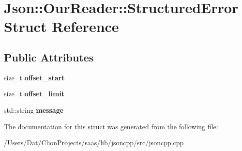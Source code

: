 \hypertarget{struct_json_1_1_our_reader_1_1_structured_error}{}\section{Json\+:\+:Our\+Reader\+:\+:Structured\+Error Struct Reference}
\label{struct_json_1_1_our_reader_1_1_structured_error}
\subsection*{Public Attributes}
\begin{DoxyCompactItemize}
\item 
size\+\_\+t {\bfseries offset\+\_\+start}\hypertarget{struct_json_1_1_our_reader_1_1_structured_error_a4eec161c2a6b4c89b6eb3d8d83834443}{}\label{struct_json_1_1_our_reader_1_1_structured_error_a4eec161c2a6b4c89b6eb3d8d83834443}

\item 
size\+\_\+t {\bfseries offset\+\_\+limit}\hypertarget{struct_json_1_1_our_reader_1_1_structured_error_a6bab2650e5230fc15427b309de79fdbe}{}\label{struct_json_1_1_our_reader_1_1_structured_error_a6bab2650e5230fc15427b309de79fdbe}

\item 
std\+::string {\bfseries message}\hypertarget{struct_json_1_1_our_reader_1_1_structured_error_adc8a757b6452cc6ab14fb90b933b3414}{}\label{struct_json_1_1_our_reader_1_1_structured_error_adc8a757b6452cc6ab14fb90b933b3414}

\end{DoxyCompactItemize}


The documentation for this struct was generated from the following file\+:\begin{DoxyCompactItemize}
\item 
/\+Users/\+Dat/\+Clion\+Projects/saas/lib/jsoncpp/src/jsoncpp.\+cpp\end{DoxyCompactItemize}
